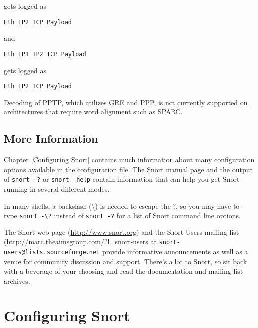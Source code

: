 \documentclass[english]{report}
\newenvironment{note}{
\samepage
    \vspace{10pt}{\textsf{
        {\hspace{7pt}\Huge{$\triangle$\hspace{-12.5pt}{\Large{$^!$}}}}\hspace{5pt}
        {\Large{NOTE}}
    }
    }
   \begin{center}
    \par\vspace{-17pt}

    \begin{lrbox}{\savepar}
    \begin{minipage}[r]{6in}
}
{
    \end{minipage}
    \end{lrbox}
    \fbox{
        \usebox{
            \savepar
	}
    }
    \par\vskip10pt
    \end{center}
}
\begin{document}
gets logged as

\begin{verbatim}
Eth IP2 TCP Payload
\end{verbatim}

and

\begin{verbatim}
Eth IP1 IP2 TCP Payload
\end{verbatim}

gets logged as

\begin{verbatim}
Eth IP2 TCP Payload
\end{verbatim}

\begin{note}
Decoding of PPTP, which utilizes GRE and PPP, is not currently supported on architectures
that require word alignment such as SPARC.
\end{note}



\section{More Information}

Chapter \ref{Configuring Snort} contains much information about many
configuration options available in the configuration file.  The Snort manual
page and the output of \texttt{snort -?} or \texttt{snort --help} contain
information that can help you get Snort running in several different modes.

\begin{note}
In many shells, a backslash (\textbackslash{}) is needed to escape the ?, so you may have to type 
\texttt{snort -\textbackslash{}?} instead of \texttt{snort -?} for a list of Snort command line options.
\end{note}

The Snort web page (\url{http://www.snort.org}) and the Snort Users mailing
list (\url{http://marc.theaimsgroup.com/?l=snort-users} at
\verb?snort-users@lists.sourceforge.net? provide informative announcements as
well as a venue for community discussion and support. There's a lot to Snort, so
sit back with a beverage of your choosing and read the documentation and
mailing list archives.

\newpage
\chapter{Configuring Snort \label{Configuring Snort}}
\end{document}
